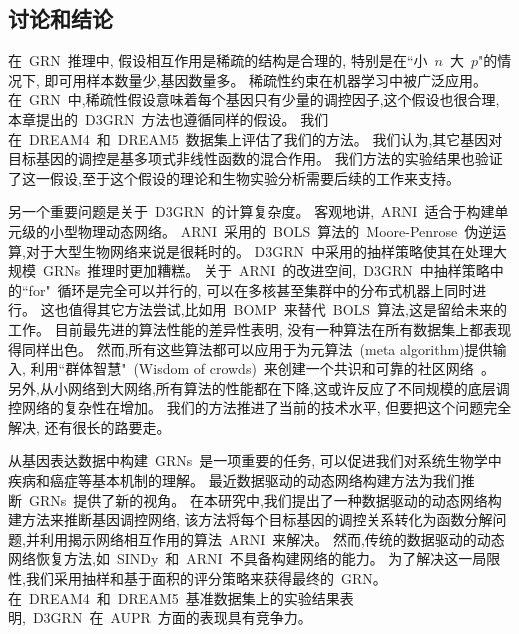 \subsection{讨论和结论}

在~GRN~推理中, 假设相互作用是稀疏的结构是合理的,
特别是在``小~$n$~大~$p$"的情况下, 即可用样本数量少,基因数量多。
稀疏性约束在机器学习中被广泛应用。
在~GRN~中,稀疏性假设意味着每个基因只有少量的调控因子,这个假设也很合理,
本章提出的~D3GRN~方法也遵循同样的假设。
我们在~DREAM4~和~DREAM5~数据集上评估了我们的方法。
我们认为,其它基因对目标基因的调控是基多项式非线性函数的混合作用。
我们方法的实验结果也验证了这一假设,至于这个假设的理论和生物实验分析需要后续的工作来支持。

另一个重要问题是关于~D3GRN~的计算复杂度。
客观地讲,~ARNI~适合于构建单元级的小型物理动态网络。
ARNI~采用的~BOLS~算法的~Moore-Penrose~伪逆运算,对于大型生物网络来说是很耗时的。
D3GRN~中采用的抽样策略使其在处理大规模~GRNs~推理时更加糟糕。
关于~ARNI~的改进空间,~D3GRN~中抽样策略中的``for"~循环是完全可以并行的,
可以在多核甚至集群中的分布式机器上同时进行。
这也值得其它方法尝试,比如用~BOMP~\cite{majumdar2009fast}来替代~BOLS~算法,这是留给未来的工作。
目前最先进的算法性能的差异性表明,
没有一种算法在所有数据集上都表现得同样出色。
然而,所有这些算法都可以应用于为元算法~(meta algorithm)提供输入,
利用``群体智慧"~(Wisdom of crowds)~来创建一个共识和可靠的社区网络~\cite{Marbach2012a,zheng2008gene}。
另外,从小网络到大网络,所有算法的性能都在下降,这或许反应了不同规模的底层调控网络的复杂性在增加。
我们的方法推进了当前的技术水平, 但要把这个问题完全解决, 还有很长的路要走。

从基因表达数据中构建~GRNs~是一项重要的任务,
可以促进我们对系统生物学中疾病和癌症等基本机制的理解。
最近数据驱动的动态网络构建方法为我们推断~GRNs~提供了新的视角。
在本研究中,我们提出了一种数据驱动的动态网络构建方法来推断基因调控网络,
该方法将每个目标基因的调控关系转化为函数分解问题,并利用揭示网络相互作用的算法~ARNI~来解决。
然而,传统的数据驱动的动态网络恢复方法,如~SINDy~和~ARNI~不具备构建网络的能力。
为了解决这一局限性,我们采用抽样和基于面积的评分策略来获得最终的~GRN。
在~DREAM4~和~DREAM5~基准数据集上的实验结果表明,~D3GRN~在~AUPR~方面的表现具有竞争力。